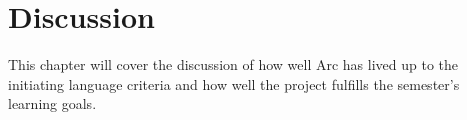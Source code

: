 \chapter{Discussion}\label{cha:discussion}

This chapter will cover the discussion of how well Arc has lived up to the initiating language criteria and how well the project fulfills the semester's learning goals.



